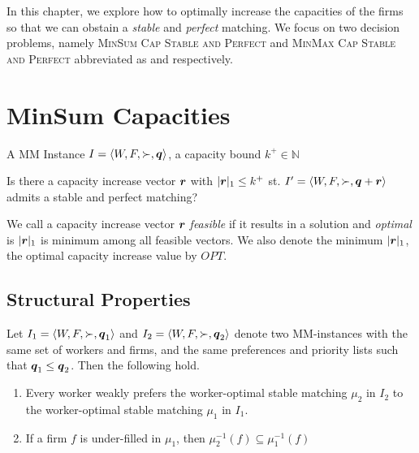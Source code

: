 In this chapter, we explore how to optimally increase the capacities of the firms so that we can obstain a \textit{stable} and \textit{perfect} matching. We focus on two decision problems, namely \textsc{MinSum Cap Stable and Perfect} and \textsc{MinMax Cap Stable and Perfect} abbreviated as \MinSumSP and \MinMaxSP respectively.

\section{MinSum Capacities}

\begin{pinput}
  A MM Instance $I = \left< W, F, \succ, \boldsymbol{q} \right>$, a capacity bound $ k^+ \in \mathbb{N}$
\end{pinput}
\begin{question}[\MinSumSP]
  Is there a capacity increase vector $\boldsymbol{r}$ with $|\boldsymbol{r}|_1 \leq k^+$ st. $I' = \left< W, F, \succ, \boldsymbol{q} + \boldsymbol{r} \right>$ admits a stable and perfect matching?
\end{question}

We call a capacity increase vector $\boldsymbol{r}$ \textit{feasible} if it results in a solution and \textit{optimal} is $|\boldsymbol{r}|_1$ is minimum among all feasible vectors. We also denote the minimum $|\boldsymbol{r}|_1$, \ie the optimal capacity increase value by $OPT$.

\subsection{Structural Properties}

\begin{lemma}
  \label{lem:weakly-prefers}
  Let $I_1 = \left< W, F, \succ, \boldsymbol{q}_1 \right>$ and $I_2 = \left< W, F, \succ, \boldsymbol{q}_2 \right>$ denote two MM-instances with the same set of workers and firms, and the same preferences and priority lists such that $\boldsymbol{q}_1 \leq \boldsymbol{q}_2$. Then the following hold.

  \renewcommand{\theenumi}{\roman{enumi}}
  \begin{enumerate}
    \item Every worker weakly prefers the worker-optimal stable matching $\mu_2$ in $I_2$ to the worker-optimal stable matching $\mu_1$ in $I_1$.
    \item If a firm $f$ is under-filled in $\mu_1$, then $\mu_2^{-1}(f) \subseteq \mu_1^{-1}(f)$
  \end{enumerate}
\end{lemma}

